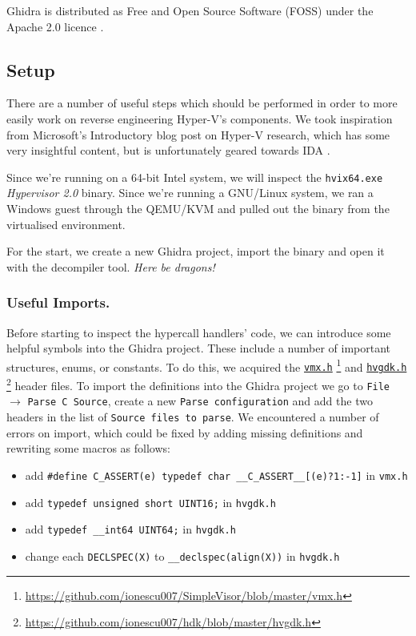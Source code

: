 \documentclass[runningheads]{llncs}
\newcommand{\cc}{\lstinline[mathescape]}
\begin{document}
Ghidra is distributed as Free and Open Source Software (FOSS) under the Apache
2.0 licence \cite{ghidra_license}. 

\subsection{Setup}

There are a number of useful steps which should be performed in order to more
easily work on reverse engineering Hyper-V's components. We took inspiration
from Microsoft's Introductory blog post on Hyper-V research, which has some
very insightful content, but is unfortunately geared towards IDA
\cite{intro_hyperv}.

Since we're running on a 64-bit Intel system, we will inspect the
\cc{hvix64.exe} \emph{Hypervisor 2.0} binary. Since we're running a GNU/Linux
system, we ran a Windows guest through the QEMU/KVM and pulled out the binary
from the virtualised environment.

For the start, we create a new Ghidra project, import the binary and open it with
the decompiler tool. \emph{Here be dragons!}

\vspace{-2mm}
\subsubsection{Useful Imports.}

Before starting to inspect the hypercall handlers' code, we can introduce some
helpful symbols into the Ghidra project. These include a number of important
structures, enums, or constants. To do this, we acquired the
\href{https://github.com/ionescu007/SimpleVisor/blob/master/vmx.h}{\cc{vmx.h}}
\footnote{\url{https://github.com/ionescu007/SimpleVisor/blob/master/vmx.h}}
and \href{https://github.com/ionescu007/hdk/blob/master/hvgdk.h}{\cc{hvgdk.h}}
\footnote{\url{https://github.com/ionescu007/hdk/blob/master/hvgdk.h}} header
files. To import the definitions into the Ghidra project we go to \cc{File}
$\to$ \cc{Parse C Source}, create a new \cc{Parse configuration} and add the
two headers in the list of \cc{Source files to parse}. We encountered a number
of errors on import, which could be fixed by adding missing definitions and
rewriting some macros as follows:

\vspace{-1mm}
\begin{itemize}
    \item add \cc{#define C_ASSERT(e) typedef char __C_ASSERT__[(e)?1:-1]} in
        \cc{vmx.h}
    \item add \cc{typedef unsigned short UINT16;} in \cc{hvgdk.h}
    \item add \cc{typedef __int64 UINT64;} in \cc{hvgdk.h}
    \item change each \cc{DECLSPEC(X)} to \cc{__declspec(align(X))} in \cc{hvgdk.h}
\end{itemize}
\end{document}
